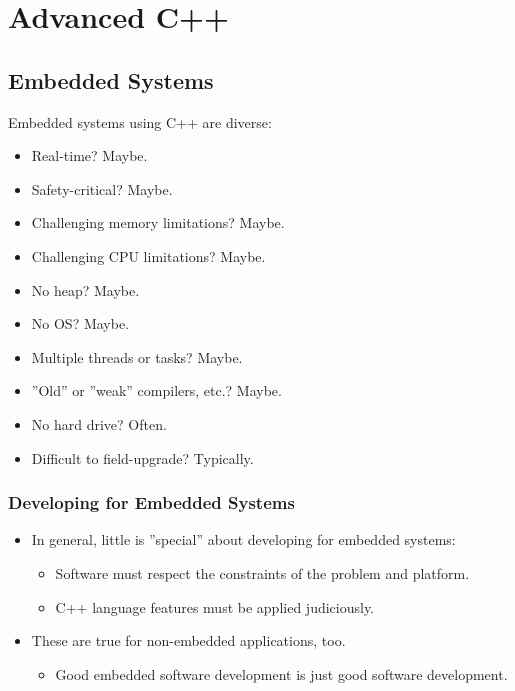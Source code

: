 \section{Advanced C++}

\subsection{Embedded Systems}
Embedded systems using C++ are diverse:
\begin{multicols}{2}
\begin{itemize}
	\item Real-time? Maybe.
	\item Safety-critical? Maybe.
	\item Challenging memory limitations? Maybe.
	\item Challenging CPU limitations? Maybe.
	\item No heap? Maybe.
\end{itemize}
\columnbreak
\begin{itemize}
	\item No OS? Maybe.
	\item Multiple threads or tasks? Maybe.
	\item ''Old'' or ''weak'' compilers, etc.? Maybe.
	\item No hard drive? Often.
	\item Difficult to field-upgrade? Typically.
\end{itemize}
\end{multicols}
\subsubsection{Developing for Embedded Systems}
\begin{itemize}
	\item In general, little is ''special'' about developing for embedded systems:
	\begin{itemize}
		\item Software must respect the constraints of the problem and platform.
		\item C++ language features must be applied judiciously.
	\end{itemize}
	\item These are true for non-embedded applications, too.
	\begin{itemize}
		\item Good embedded software development is just good software development.
	\end{itemize}
\end{itemize}

